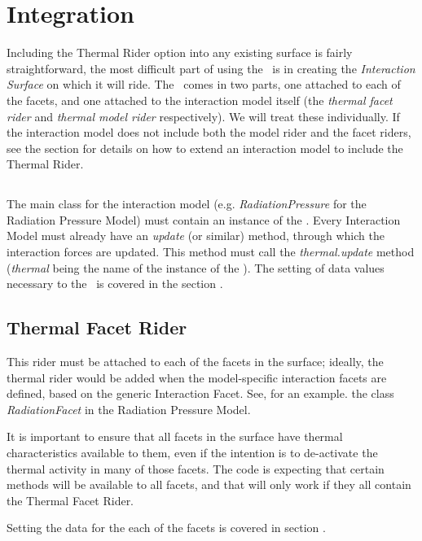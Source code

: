 %
%
% 
%

 \section{Integration}
 \label{sec:user_integration}

Including the Thermal Rider option into any existing surface is fairly straightforward, the most difficult part of using the \ThermalRiderDesc\ is in creating the \textit{Interaction Surface} on which it will ride.  The \ThermalRiderDesc\ comes in two parts, one attached to each of the facets, and one attached to the interaction model itself (the \textit{thermal facet rider} and \textit{thermal model rider} respectively).  We will treat these individually.  If the interaction model does not include both the model rider and the facet riders, see the section  for details on how to extend an interaction model to include the Thermal Rider.

\subsection{\ThermalRiderDesc}
The main class for the interaction model (e.g. \textit{RadiationPressure} for the Radiation Pressure Model) must contain an instance of the \ThermalRiderDesc.
Every Interaction Model must already have an \textit{update} (or similar) method, through which the interaction forces are updated.  This method must call the \textit{thermal.update} method (\textit{thermal} being the name of the instance of the \ThermalRiderDesc).  The setting of data values necessary to the \ThermalRiderDesc\ is covered in the section .



\subsection{Thermal Facet Rider}
This rider must be attached to each of the facets in the surface; ideally, the thermal rider would be added when the model-specific interaction facets are defined, based on the generic Interaction Facet.  See, for an example. the class \textit{RadiationFacet} in the Radiation Pressure Model. 

It is important to ensure that all facets in the surface have thermal characteristics available to them, even if the intention is to de-activate the thermal activity in many of those facets.  The code is expecting that certain methods will be available to all facets, and that will only work if they all contain the Thermal Facet Rider.

Setting the data for the each of the facets is covered in section .







